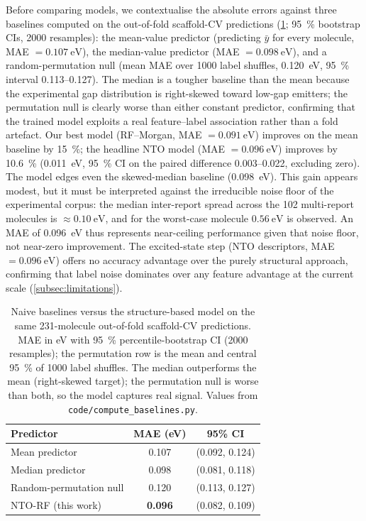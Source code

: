 Before comparing models, we contextualise the absolute errors against three
baselines computed on the out-of-fold scaffold-CV predictions
(\cref{tab:baselines}; \qty{95}{\percent} bootstrap CIs, \num{2000} resamples):
the mean-value predictor (predicting $\bar{y}$ for every molecule,
MAE $= \qty{0.107}{\electronvolt}$), the median-value predictor
(MAE $= \qty{0.098}{\electronvolt}$), and a random-permutation null (mean MAE
over \num{1000} label shuffles, \qty{0.120}{\electronvolt}, \qty{95}{\percent}
interval \numrange{0.113}{0.127}).
The median is a tougher baseline than the mean because the experimental gap
distribution is right-skewed toward low-gap emitters; the permutation null is
clearly worse than either constant predictor, confirming that the trained model
exploits a real feature--label association rather than a fold artefact.
Our best model (RF--Morgan, MAE $= \qty{0.091}{\electronvolt}$) improves on the
mean baseline by \qty{15}{\percent}; the headline NTO model
(MAE $= \qty{0.096}{\electronvolt}$) improves by \qty{10.6}{\percent}
(\qty{0.011}{\electronvolt}, \qty{95}{\percent} CI on the paired difference
\numrange{0.003}{0.022}, excluding zero). The model edges even the skewed-median
baseline (\qty{0.098}{\electronvolt}).
This gain appears modest, but it must be interpreted against the
irreducible noise floor of the experimental corpus: the median inter-report
spread across the \num{102} multi-report molecules is
$\approx\qty{0.10}{\electronvolt}$, and for the worst-case molecule
$\qty{0.56}{\electronvolt}$ is observed.
An MAE of \qty{0.096}{\electronvolt} thus represents near-ceiling performance
given that noise floor, not near-zero improvement.
The excited-state step (NTO descriptors, MAE $= \qty{0.096}{\electronvolt}$)
offers no accuracy advantage over the purely structural approach, confirming
that label noise dominates over any feature advantage at the current scale
(\cref{subsec:limitations}).

\begin{table}[htbp]
  \centering
  \caption{Naive baselines versus the structure-based model on the same
    \num{231}-molecule out-of-fold scaffold-CV predictions. MAE in eV with
    \qty{95}{\percent} percentile-bootstrap CI (\num{2000} resamples); the
    permutation row is the mean and central \qty{95}{\percent} of \num{1000}
    label shuffles. The median outperforms the mean (right-skewed target); the
    permutation null is worse than both, so the model captures real signal.
    Values from \texttt{code/compute\_baselines.py}.}
  \label{tab:baselines}
  \begin{tabular}{lcc}
    \toprule
    Predictor & MAE (eV) & 95\% CI \\
    \midrule
    Mean predictor          & 0.107 & (0.092, 0.124) \\
    Median predictor        & 0.098 & (0.081, 0.118) \\
    Random-permutation null & 0.120 & (0.113, 0.127) \\
    \midrule
    NTO-RF (this work)      & \textbf{0.096} & (0.082, 0.109) \\
    \bottomrule
  \end{tabular}
\end{table}

